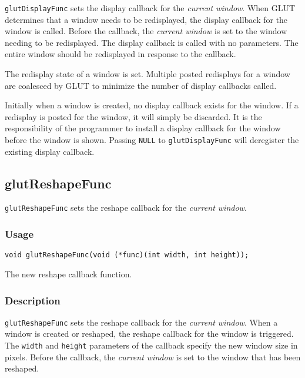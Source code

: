 {\tt glutDisplayFunc} sets the display callback for the {\em current window}.
When GLUT determines that a window needs to be redisplayed, the display callback for the window
is called.  Before the callback, the {\em current window} is
set to the window needing to be redisplayed.  The display callback is
called with no parameters.  The entire window should be redisplayed
in response to the callback.

The redisplay state of a window is set.  Multiple posted redisplays
for a window are coalesced by GLUT to minimize the number of display
callbacks called.

Initially when a window is created, no display callback exists for
the window.  If a redisplay is posted for the window, it will simply
be discarded.  It is the responsibility of the programmer to install
a display callback for the window before the window is shown.  Passing {\tt NULL} to
{\tt glutDisplayFunc} will deregister the existing display callback.

\subsection{glutReshapeFunc}

{\tt glutReshapeFunc} sets the reshape callback for the {\em current window}.

\subsubsection*{Usage}
\begin{verbatim}
void glutReshapeFunc(void (*func)(int width, int height));
\end{verbatim}
\begin{description}
\itemsep 0in
\item[\tt func]
The new reshape callback function.
\end{description}

\subsubsection*{Description}

{\tt glutReshapeFunc} sets the reshape callback for the {\em current window}.
When a window is created or reshaped, the reshape callback for the window
is triggered.  The {\tt width} and {\tt height} parameters of the callback
specify the new window size in pixels.  Before the callback, the {\em current
window} is set to the window that has been reshaped.

